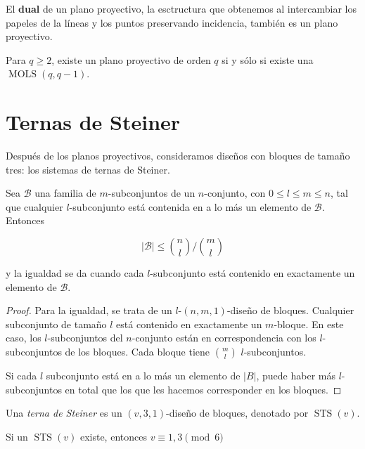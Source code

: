 \begin{proposition}
\label{proposition-combi-010}
El \textbf{dual} de un plano proyectivo, la
esctructura que obtenemos al intercambiar los
papeles de la líneas y los puntos preservando
incidencia, también es un plano proyectivo.
\end{proposition}
\begin{theorem}
\label{theorem-combi-026}
Para $q\geq2$, existe un plano proyectivo de
orden $q$ si y sólo si existe una $
\operatorname{MOLS}(q,q-1)$.
\end{theorem}
\section{Ternas de Steiner}
\label{section-ternas-de-steiner}
Después de los planos proyectivos,
consideramos diseños con bloques de tamaño
tres: los sistemas de ternas de Steiner.
\begin{proposition}[Cameron, 8.1.1]
\label{proposition-combi-011}Sea
$\mathcal{B}$ una familia de $m$-subconjuntos
de un $n$-conjunto, con $0\leq l\leq m\leq
n$,
tal que cualquier
$l$-subconjunto está contenida en a lo más un
elemento de $\mathcal{B}$. Entonces

$$
|\mathcal{B}|\leq{n \choose l}\Big/{m \choose
l}
$$

y la igualdad se da cuando cada
$l$-subconjunto está contenido en exactamente
un elemento de $\mathcal{B}$.
\end{proposition}
\begin{proof}
Para la igualdad, se trata de un
$l$-$(n,m,1)$-diseño de bloques. Cualquier
subconjunto de tamaño $l$ está contenido en
exactamente un $m$-bloque. En este caso, los
$l$-subconjuntos del $n$-conjunto están en
correspondencia con los $l$-subconjuntos de
los bloques. Cada bloque tiene ${m \choose
l}$ $l$-subconjuntos.

Si cada $l$ subconjunto está en a lo más un
elemento de $|B|$, puede haber más
$l$-subconjuntos en total que los que les
hacemos corresponder en los bloques.
\end{proof}
\begin{definition}
\label{definition-combi-030}
Una \emph{terna de Steiner} es un
$(v,3,1)$-diseño de bloques, denotado por $
\operatorname{STS}(v)$.
\end{definition}
\begin{theorem}
\label{theorem-combi-027}
Si un $ \operatorname{STS}(v)$ existe,
entonces $v\equiv1,3\pmod6$
\end{theorem}
